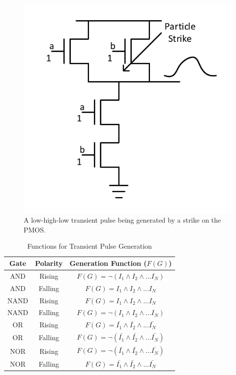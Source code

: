 \begin{figure}[!htbp]
	\centering
	\includegraphics[width=0.55\linewidth]{Figures/NAND_Strike}
	\caption{A low-high-low transient pulse being generated by a strike on the PMOS.}
	\label{NANDS}
\end{figure}

\begin{table}[ht]
	\begin{center}
		\caption{Functions for Transient Pulse Generation}
		\label{table:gentable}
		\begin{tabular}{|c|c|c|}
			\hline
			Gate & Polarity & Generation Function ($F(G)$) \\ 
			\hline
			AND & Rising & $F(G) =  \lnot (I_1 \land I_2 \land ... I_N)$ \\
			\hline
			AND & Falling & $F(G) = I_1 \land I_2 \land ... I_N$ \\
			\hline
			NAND & Rising & $F(G) = I_1 \land I_2 \land ... I_N$ \\
			\hline
			NAND & Falling & $F(G) = \lnot (I_1 \land I_2 \land ... I_N)$ \\
			\hline
			OR & Rising & $F(G) = \bar{I_1} \land \bar{I_2} \land ... \bar{I_N}$ \\
			\hline
			OR & Falling & $F(G) = \lnot ( \bar{I_1} \land \bar{I_2} \land ... \bar{I_N})$ \\
			\hline
			NOR & Rising & $F(G) = \lnot ( \bar{I_1} \land \bar{I_2} \land ... \bar{I_N})$ \\
			\hline
			NOR & Falling & $F(G) = \bar{I_1} \land \bar{I_2} \land ... \bar{I_N}$ \\
			\hline
		\end{tabular}
	\end{center}
\end{table}

